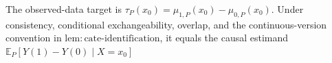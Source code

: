 The observed-data target is \(\tau_P(x_0)=\mu_{1,P}(x_0)-\mu_{0,P}(x_0)\).  Under consistency, conditional exchangeability, overlap, and the continuous-version convention in \(\mathrm{lem:cate\mbox{-}identification}\), it equals the causal estimand \(\mathbb E_P[Y(1)-Y(0)\mid X=x_0]\)